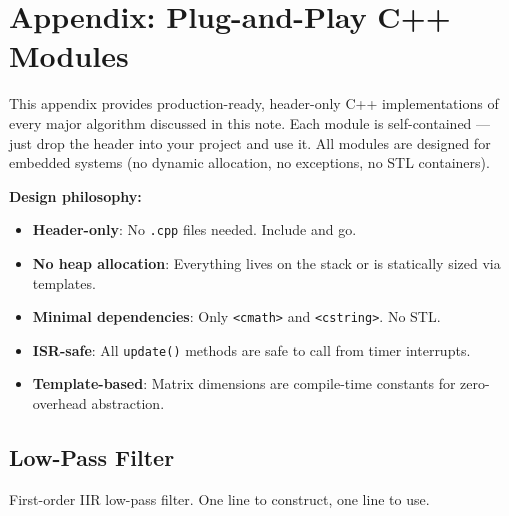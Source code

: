\section{Appendix: Plug-and-Play C++ Modules}

This appendix provides production-ready, header-only C++ implementations of every major algorithm discussed in this note. Each module is self-contained --- just drop the header into your project and use it. All modules are designed for embedded systems (no dynamic allocation, no exceptions, no STL containers).

\textbf{Design philosophy:}
\begin{itemize}
    \item \textbf{Header-only}: No \texttt{.cpp} files needed. Include and go.
    \item \textbf{No heap allocation}: Everything lives on the stack or is statically sized via templates.
    \item \textbf{Minimal dependencies}: Only \texttt{<cmath>} and \texttt{<cstring>}. No STL.
    \item \textbf{ISR-safe}: All \texttt{update()} methods are safe to call from timer interrupts.
    \item \textbf{Template-based}: Matrix dimensions are compile-time constants for zero-overhead abstraction.
\end{itemize}

\subsection{Low-Pass Filter}

First-order IIR low-pass filter. One line to construct, one line to use.

